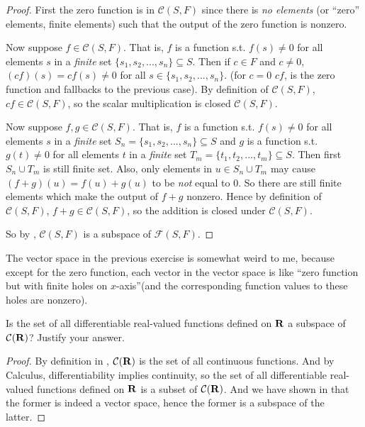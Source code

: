 \begin{proof}
First the zero function is in \(\mathcal{C}(S, F)\) since there is \emph{no elements} (or ``zero'' elements, finite elements) such that the output of the zero function is nonzero.

Now suppose \(f \in \mathcal{C}(S, F)\).
That is, \(f\) is a function s.t. \(f(s) \ne 0\) for all elements \(s\) in a \emph{finite} set \(\{ s_1, s_2, ..., s_n \} \subseteq S\).
Then if \(c \in F\) and \(c \ne 0\), \((cf)(s) = cf(s) \ne 0\) for all \(s \in \{ s_1, s_2, ..., s_n \} \).
(for \(c = 0\) \(cf\), is the zero function and fallbacks to the previous case).
By definition of \(\mathcal{C}(S, F)\), \(cf \in \mathcal{C}(S, F)\), so the scalar multiplication is closed  \(\mathcal{C}(S, F)\).

Now suppose \(f, g \in \mathcal{C}(S, F)\).
That is, \(f\) is a function s.t. \(f(s) \ne 0\) for all elements \(s\) in a \emph{finite} set \(S_n = \{ s_1, s_2, ..., s_n \} \subseteq S \) and \(g\) is a function s.t. \(g(t) \ne 0\) for all elements \(t\) in a \emph{finite} set \(T_m = \{ t_1, t_2, ..., t_m \} \subseteq S\).
Then first \(S_n \cup T_m\) is still finite set.
Also, only elements in \(u \in S_n \cup T_m\) may cause \((f + g)(u) = f(u) + g(u)\) to be \emph{not} equal to \(0\).
So there are still finite elements which make the output of \(f + g\) nonzero.
Hence by definition of \(\mathcal{C}(S, F)\), \(f + g \in \mathcal{C}(S, F)\), so the addition is closed under \(\mathcal{C}(S, F)\).

So by , \(\mathcal{C}(S, F)\) is a subspace of \(\mathcal{F}(S, F)\).
\end{proof}

\begin{note}
The vector space in the previous exercise is somewhat weird to me, because except for the zero function, each vector in the vector space is like ``zero function but with finite holes on \(x\)-axis''(and the corresponding function values to these holes are nonzero).
\end{note}

\begin{exercise} \label{exercise 1.3.15}
Is the set of all differentiable real-valued functions defined on \(\mathbf{R}\) a subspace of \(\mathcal{C}(\mathbf{R})\)?
Justify your answer.
\end{exercise}

\begin{proof}
By definition in , \(\mathcal{C}(\mathbf{R})\) is the set of all continuous functions.
And by Calculus, differentiability implies continuity, so the set of all differentiable real-valued functions defined on \(\mathbf{R}\) is a subset of \(\mathcal{C}(\mathbf{R})\).
And we have shown in  that the former is indeed a vector space, hence the former is a subspace of the latter.
\end{proof}

